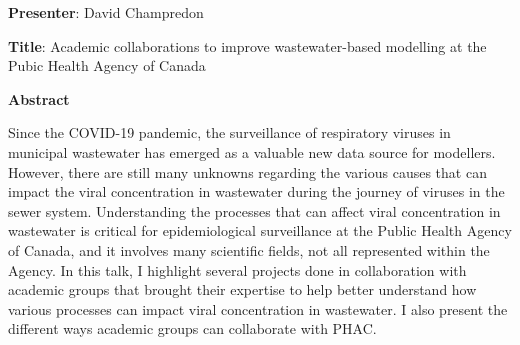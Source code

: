 
\textbf{Presenter}: David Champredon

\textbf{Title}: Academic collaborations to improve wastewater-based modelling at the Pubic Health Agency of Canada

\textbf{Abstract}

Since the COVID-19 pandemic, the surveillance of respiratory viruses in municipal wastewater has emerged as a valuable new data source for modellers.
However, there are still many unknowns regarding the various causes that can impact the viral concentration in wastewater during the journey of viruses in the sewer system.
Understanding the processes that can affect viral concentration in wastewater is critical for epidemiological surveillance at the Public Health Agency of Canada, and it involves many scientific fields, not all represented within the Agency.
In this talk, I highlight several projects done in collaboration with academic groups that brought their expertise to help better understand how various processes can impact viral concentration in wastewater. I also present the different ways academic groups can collaborate with PHAC.




























